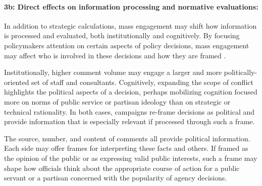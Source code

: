 \paragraph{3b: Direct effects on information processing and normative evaluations:}
In addition to strategic calculations, mass engagement may shift how information is processed and evaluated, both institutionally and cognitively. %
By focusing policymakers attention on certain aspects of policy decisions, mass engagement may affect who is involved in these decisions and how they are framed \citep{Rinfret2011}.

Institutionally, higher comment volume may engage a larger and more politically-oriented set of staff and consultants. Cognitively, expanding the scope of conflict highlights the political aspects of a decision, perhaps mobilizing cognition focused more on norms of public service or partisan ideology than on strategic or technical rationality. In both cases, campaigns re-frame decisions as political and provide information that is especially relevant if processed through such a frame.

The source, number, and content of comments all provide political information. Each side may offer frames for interpreting these facts and others. If 
framed as the opinion of the public or as expressing valid public interests, such a frame may shape how officials think about the appropriate course of action for a public servant or a partisan concerned with the popularity of agency decisions. 


